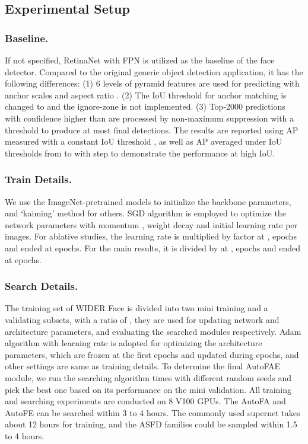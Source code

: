 \documentclass[sigconf]{acmart}
\begin{document}
\subsection{Experimental Setup}
\subsubsection{Baseline.} If not specified, RetinaNet \cite{lin2017focal} with FPN is utilized as the baseline of the face detector. Compared to the original generic object detection application, it has the following differences: (1) 6 levels of pyramid features are used for predicting with anchor scales  and aspect ratio . (2) The IoU threshold for anchor matching is changed to  and the ignore-zone is not implemented. (3) Top-2000 predictions with confidence higher than  are processed by non-maximum suppression with a threshold  to produce at most  final detections. 
The results are reported using AP measured with a constant IoU threshold , as well as AP averaged under IoU thresholds from  to  with step  to demonstrate the performance at high IoU.


\subsubsection{Train Details.} We use the ImageNet-pretrained models to initialize the backbone parameters, and `kaiming' method for others. SGD algorithm is employed to optimize the network parameters with momentum , weight decay  and initial learning rate  per  images. For ablative studies, the learning rate is multiplied by factor  at ,  epochs and ended at  epochs.
For the main results, it is divided by  at ,  epochs and ended at  epochs.


\subsubsection{Search Details.} The training set of WIDER Face is divided into two mini training and a validating subsets, with a ratio of , they are used for updating network and architecture parameters, and evaluating the searched modules respectively.
Adam algorithm with learning rate  is adopted for optimizing the architecture parameters, which are frozen at the first  epochs and updated during  epochs, and other settings are same as training details. To determine the final AutoFAE module, we run the searching algorithm  times with different random seeds and pick the best one based on its performance on the mini validation. All training and searching experiments are conducted on 8 V100 GPUs. The AutoFA and AutoFE can be searched within 3 to 4 hours. The commonly used supernet takes about 12 hours for training, and the ASFD families could be sampled within 1.5 to 4 hours. 
\end{document}
